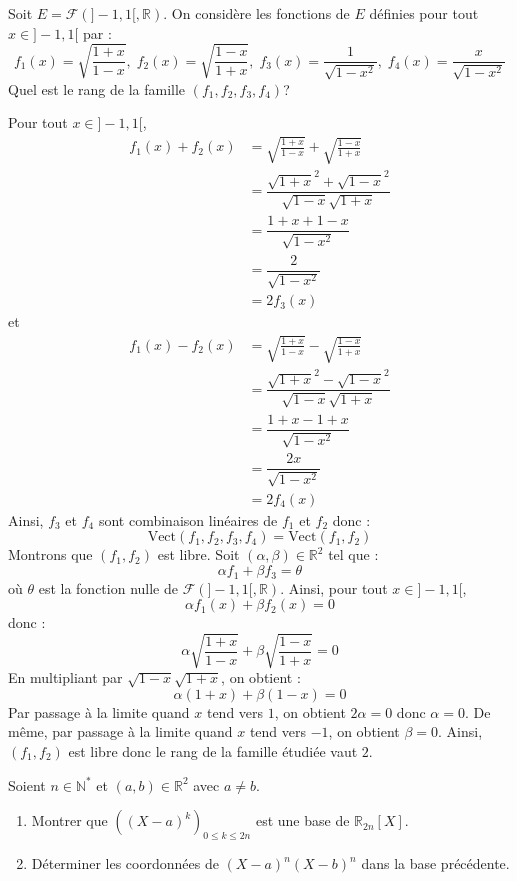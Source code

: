 \documentclass[a4paper,twoside,french,11pt]{VcCours}
\begin{document}
\begin{Exercice}{} Soit $E = \mathcal{F}(]-1,1[, \mathbb{R})$. On considère les fonctions de $E$ définies pour tout $x \in ]-1,1[$ par : 
    \[
    f_1(x) = \sqrt {\frac{1 + x}{1 - x}} , \; f_2(x) = \sqrt {\frac{1 - x}{1 + x}} , \; f_3(x) = \frac{1}{\sqrt {1 - x^2}}, \; f_4(x) = \frac{x}{\sqrt {1 - x^2}}
    \]
Quel est le rang de la famille $(f_1 ,f_2 ,f_3 ,f_4)$?
\end{Exercice}

\corr Pour tout $x \in ]-1,1[$,
\begin{align*}
 f_1(x)+f_2(x) & = \sqrt {\frac{1 + x}{1 - x}} + \sqrt {\frac{1 - x}{1 + x}}  \\
 & = \dfrac{\sqrt{1+x}^2 + \sqrt{1-x}^2}{\sqrt{1-x}\sqrt{1+x}} \\
 & = \dfrac{1+x+1-x}{\sqrt{1-x^2}}\\
 & = \dfrac{2}{\sqrt{1-x^2}}\\
 & = 2 f_3(x)
 \end{align*}
et 
\begin{align*}
 f_1(x)-f_2(x) & = \sqrt {\frac{1 + x}{1 - x}} - \sqrt {\frac{1 - x}{1 + x}}  \\
 & = \dfrac{\sqrt{1+x}^2 - \sqrt{1-x}^2}{\sqrt{1-x}\sqrt{1+x}} \\
 & = \dfrac{1+x-1+x}{\sqrt{1-x^2}}\\
 & = \dfrac{2x}{\sqrt{1-x^2}}\\
 & = 2 f_4(x)
 \end{align*}
 Ainsi, $f_3$ et $f_4$ sont combinaison linéaires de $f_1$ et $f_2$ donc :
 $$ \textrm{Vect}(f_1,f_2,f_3,f_4) = \textrm{Vect}(f_1,f_2)$$
Montrons que $(f_1,f_2)$ est libre. Soit $(\alpha, \beta) \in \mathbb{R}^2$ tel que :
$$ \alpha f_1 + \beta f_3 = \theta$$
où $\theta$ est la fonction nulle de $\mathcal{F}(]-1,1[, \mathbb{R})$. Ainsi, pour tout $x \in ]-1,1[$,
$$ \alpha f_1(x)+ \beta f_2(x) = 0$$
donc :
$$ \alpha \sqrt {\frac{1 + x}{1 - x}} +  \beta \sqrt {\frac{1 - x}{1 + x}} = 0$$
En multipliant par $\sqrt{1-x} \sqrt{1+x}$, on obtient :
$$ \alpha (1+x) + \beta (1-x) = 0$$
Par passage à la limite quand $x$ tend vers $1$, on obtient $2\alpha=0$ donc $\alpha=0$. De même, par passage à la limite quand $x$ tend vers $-1$, on obtient $\beta=0$. Ainsi, $(f_1,f_2)$ est libre donc le rang de la famille étudiée vaut $2$.


\begin{Exercice}{} Soient $n \in \mathbb{N}^*$ et $(a,b) \in \mathbb{R}^2$ avec $a \neq b$.
\begin{enumerate}
\item Montrer que $((X-a)^k)_{0 \leq k \leq 2n}$ est une base de $\mathbb{R}_{2n}[X]$.
\item Déterminer les coordonnées de $(X-a)^n(X-b)^n$ dans la base précédente.
\end{enumerate}
\end{Exercice} 
\end{document}
